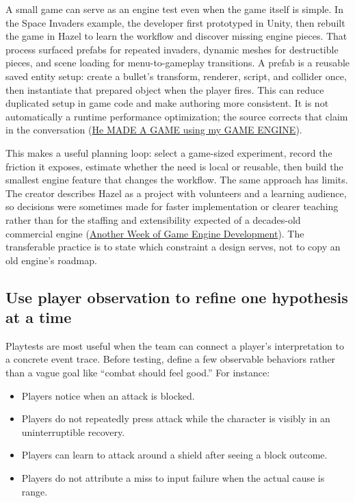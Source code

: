 A small game can serve as an engine test even when the game itself is simple. In the Space Invaders example, the developer first prototyped in Unity, then rebuilt the game in Hazel to learn the workflow and discover missing engine pieces. That process surfaced prefabs for repeated invaders, dynamic meshes for destructible pieces, and scene loading for menu-to-gameplay transitions. A prefab is a reusable saved entity setup: create a bullet's transform, renderer, script, and collider once, then instantiate that prepared object when the player fires. This can reduce duplicated setup in game code and make authoring more consistent. It is not automatically a runtime performance optimization; the source corrects that claim in the conversation (\href{https://www.youtube.com/watch?v=56ISmbJE9S4&t=2m10s}{He MADE A GAME using my GAME ENGINE}).

This makes a useful planning loop: select a game-sized experiment, record the friction it exposes, estimate whether the need is local or reusable, then build the smallest engine feature that changes the workflow. The same approach has limits. The creator describes Hazel as a project with volunteers and a learning audience, so decisions were sometimes made for faster implementation or clearer teaching rather than for the staffing and extensibility expected of a decades-old commercial engine (\href{https://www.youtube.com/watch?v=Dr6ly-PO9nM&t=1m45s}{Another Week of Game Engine Development}). The transferable practice is to state which constraint a design serves, not to copy an old engine's roadmap.

\subsection{Use player observation to refine one hypothesis at a time}\label{06-engine-ii-ch041-use-player-observation-to-refine-one-hypothesis-at-a-time}

\hypertarget{06-engine-ii-ch041-use-player-observation-to-refine-one-hypothesis-at-a-time}{}

Playtests are most useful when the team can connect a player's interpretation to a concrete event trace. Before testing, define a few observable behaviors rather than a vague goal like ``combat should feel good.'' For instance:

\begin{itemize}
\tightlist
\item
  Players notice when an attack is blocked.
\item
  Players do not repeatedly press attack while the character is visibly in an uninterruptible recovery.
\item
  Players can learn to attack around a shield after seeing a block outcome.
\item
  Players do not attribute a miss to input failure when the actual cause is range.
\end{itemize}

